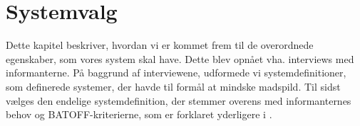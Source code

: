 \chapter{Systemvalg}
\label{chap:systemvalg}
Dette kapitel beskriver, hvordan vi er kommet frem til de overordnede egenskaber, som vores system skal have. Dette blev opnået vha. interviews med informanterne. På baggrund af interviewene, udformede vi systemdefinitioner, som definerede systemer, der havde til formål at mindske madspild. Til sidst vælges den endelige systemdefinition, der stemmer overens med informanternes behov og BATOFF-kriterierne, som er forklaret yderligere i .



